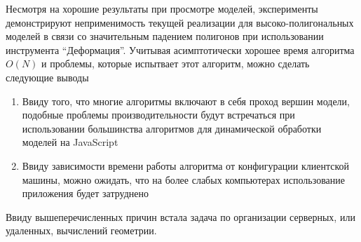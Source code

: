 Несмотря на хорошие результаты при просмотре моделей,
эксперименты демонстрируют неприменимость текущей реализации для
высоко-полигональных моделей в связи со значительным падением полигонов при
использовании инструмента ``Деформация''. Учитывая асимптотически хорошее время
алгоритма $O(N)$ и проблемы, которые испытвает этот алгоритм, можно сделать
следующие выводы

\begin{enumerate}
    \item Ввиду того, что многие алгоритмы включают в себя проход вершин модели,
    подобные проблемы производительности будут встречаться при
    использовании большинства алгоритмов для динамической обработки моделей на
    JavaScript
    \item Ввиду зависимости времени работы алгоритма от конфигурации клиентской
    машины, можно ожидать, что на более слабых компьютерах использование
    приложения будет затруднено
\end{enumerate}

Ввиду вышеперечисленных причин встала задача по организации серверных, или
удаленных, вычислений геометрии.

